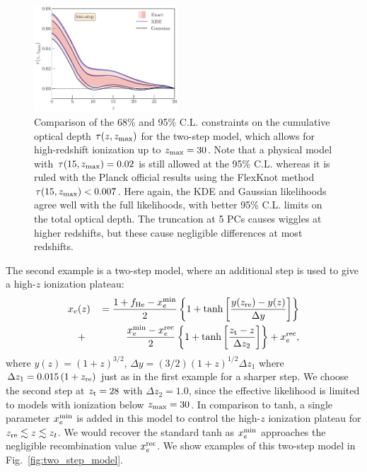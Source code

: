 \documentclass[prd,twocolumn,amsmath,amssymb,floatfix,superscriptaddress,nofootinbib]{revtex4-1}
\newcommand{\zmax}{z_{\rm max}}
\newcommand{\xemin}{x_e^{\rm min}}
\newcommand{\bea}{\begin{eqnarray}}
\newcommand{\eea}{\end{eqnarray}}
\begin{document}
\begin{figure}
\includegraphics[width=0.48\textwidth]
{paper/plots/pl18_taugtz_tanh_highz_direct_vs_kde_vs_gaussian.pdf}
\caption{Comparison of the 68\% and 95\% C.L. constraints on the cumulative optical depth $\tau(z, \zmax)$ for the two-step model, which allows for high-redshift ionization up to $\zmax =30$. Note that a physical model with $\tau(15, \zmax) = 0.02$ is still allowed at the 95\% C.L. whereas it is ruled with the Planck official results using the FlexKnot method $\tau(15, \zmax) < 0.007$. Here again, the KDE and Gaussian likelihoods agree well with the full likelihoods, with better 95\% C.L. limits on the total optical depth. The truncation at 5 PCs causes wiggles at higher redshifts, but these cause negligible differences at most redshifts.}
\label{fig:plot_taugtz_two_step_contours}
\end{figure}
 
 
The second example is a two-step model, where an additional step is used to give a high-$z$ ionization plateau: 
 \bea
x_e&(z)&\,= \frac{1+f_{\rm He} - \xemin}{2}\left\{  1+ \tanh\left[ \frac{y(z_{\rm re})-y(z)}{\Delta y} \right] \right\} \notag \\
&+& \frac{\xemin - x_e^{\rm rec}}{2}\left\{  1+ \tanh\left[ \frac{z_{\rm t}-z}{\Delta z_{2}} \right] \right\} + x_e^{\rm rec},
 \label{eqn:tanh_highz}
 \eea
where $y(z)=(1+z)^{3/2}$, $\Delta y=(3/2)(1+z)^{1/2}\Delta z_1$ where $\Delta z_1 = 0.015\, (1+z_{\rm re})$ just as in the first example for a sharper step.
We choose the second step at $z_{\rm t}=28$ with $\Delta z_2 = 1.0$, since the effective likelihood is limited to models with ionization below $\zmax=30$. 
In comparison to tanh, a single parameter $\xemin$ is added in this model to control the high-$z$ ionization plateau for $z_{\rm re} \lesssim z \lesssim z_t$. We would recover the standard tanh as $\xemin$ approaches the negligible recombination value $x_e^{\rm rec}$. We show examples
of this two-step model in Fig.~\ref{fig:two_step_model}.
\end{document}
